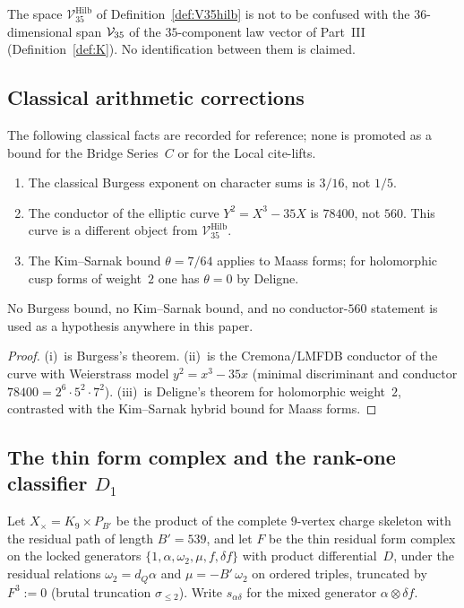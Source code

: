 \begin{remark}\label{rem:V35-vs-VV}
The space $\mathcal V_{35}^{\mathrm{Hilb}}$ of Definition~\ref{def:V35hilb} is not to be confused with the $36$-dimensional span $\mathcal V_{35}$ of the $35$-component law vector of Part~III (Definition~\ref{def:K}). No identification between them is claimed.
\end{remark}

\subsection{Classical arithmetic corrections}
\begin{proposition}\label{prop:classical-corr}
The following classical facts are recorded for reference; none is promoted as a bound for the Bridge Series~$C$ or for the Local cite-lifts.
\begin{enumerate}[label=(\roman*)]
\item The classical Burgess exponent on character sums is $3/16$, not $1/5$.
\item The conductor of the elliptic curve $Y^2=X^3-35X$ is $78400$, not $560$. This curve is a different object from $\mathcal V_{35}^{\mathrm{Hilb}}$.
\item The Kim--Sarnak bound $\theta=7/64$ applies to Maass forms; for holomorphic cusp forms of weight~$2$ one has $\theta=0$ by Deligne.
\end{enumerate}
No Burgess bound, no Kim--Sarnak bound, and no conductor-$560$ statement is used as a hypothesis anywhere in this paper.
\end{proposition}
\begin{proof}
(i)~is Burgess's theorem. (ii)~is the Cremona/LMFDB conductor of the curve with Weierstrass model $y^2=x^3-35x$ (minimal discriminant and conductor $78400=2^6\cdot5^2\cdot7^2$). (iii)~is Deligne's theorem for holomorphic weight~$2$, contrasted with the Kim--Sarnak hybrid bound for Maass forms.
\end{proof}

\subsection{The thin form complex and the rank-one classifier $D_1$}
Let $X_\times=K_9\times P_{B'}$ be the product of the complete $9$-vertex charge skeleton with the residual path of length $B'=539$, and let $F$ be the thin residual form complex on the locked generators $\{1,\alpha,\omega_2,\mu,f,\delta f\}$ with product differential~$D$, under the residual relations $\omega_2=d_Q\alpha$ and $\mu=-B'\,\omega_2$ on ordered triples, truncated by $F^3:=0$ (brutal truncation $\sigma_{\le2}$). Write $s_{\alpha\delta}$ for the mixed generator $\alpha\otimes\delta f$.

